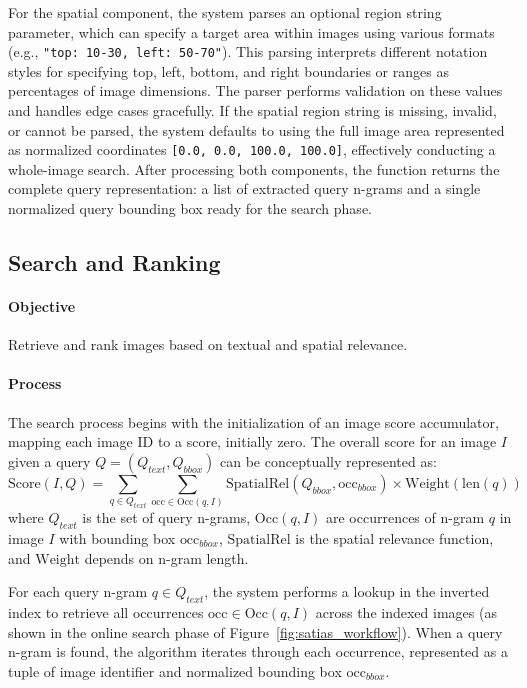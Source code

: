 \documentclass[manuscript,screen]{acmart}
\begin{document}
For the spatial component, the system parses an optional region string parameter, which can specify a target area within images using various formats (e.g., \verb|"top: 10-30, left: 50-70"|). This parsing interprets different notation styles for specifying top, left, bottom, and right boundaries or ranges as percentages of image dimensions. The parser performs validation on these values and handles edge cases gracefully. If the spatial region string is missing, invalid, or cannot be parsed, the system defaults to using the full image area represented as normalized coordinates \verb|[0.0, 0.0, 100.0, 100.0]|, effectively conducting a whole-image search. After processing both components, the function returns the complete query representation: a list of extracted query n-grams and a single normalized query bounding box ready for the search phase.

\subsection{Search and Ranking}

\paragraph{Objective} Retrieve and rank images based on textual and spatial relevance.

\paragraph{Process} The search process begins with the initialization of an image score accumulator, mapping each image ID to a score, initially zero. The overall score for an image $I$ given a query $Q = (Q_{text}, Q_{bbox})$ can be conceptually represented as:
\[
    \text{Score}(I, Q) = \sum_{q \in Q_{text}} \sum_{\text{occ} \in \text{Occ}(q, I)} \text{SpatialRel}(Q_{bbox}, \text{occ}_{bbox}) \times \text{Weight}(\text{len}(q))
\]
where $Q_{text}$ is the set of query n-grams, $\text{Occ}(q, I)$ are occurrences of n-gram $q$ in image $I$ with bounding box $\text{occ}_{bbox}$, $\text{SpatialRel}$ is the spatial relevance function, and $\text{Weight}$ depends on n-gram length.

For each query n-gram $q \in Q_{text}$, the system performs a lookup in the inverted index to retrieve all occurrences $\text{occ} \in \text{Occ}(q, I)$ across the indexed images (as shown in the online search phase of Figure~\ref{fig:satias_workflow}). When a query n-gram is found, the algorithm iterates through each occurrence, represented as a tuple of image identifier and normalized bounding box $\text{occ}_{bbox}$.
\end{document}
